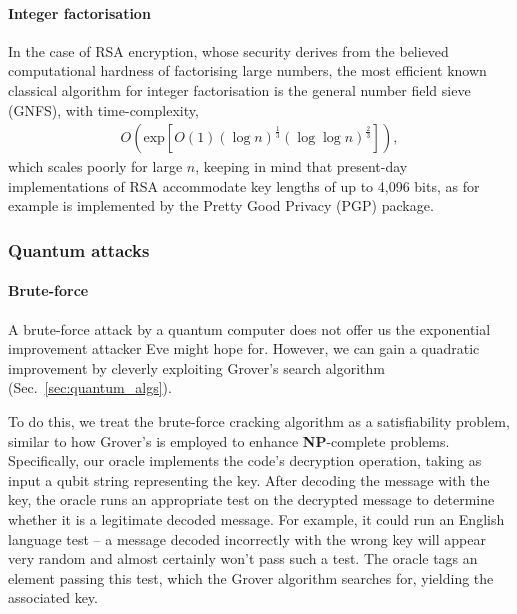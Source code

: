 %
%
 
\paragraph{Integer factorisation}

In the case of RSA encryption, whose security derives from the believed computational hardness of factorising large numbers, the most efficient known classical algorithm for integer factorisation is the general number field sieve (GNFS), with time-complexity,
\begin{align} \label{eq:GNFS_scaling}
	O(\mathrm{exp}[O(1) (\log n)^{\frac{1}{3}} (\log\log n)^{\frac{2}{3}}]),
\end{align}
which scales poorly for large $n$, keeping in mind that present-day implementations of RSA accommodate key lengths of up to 4,096 bits, as for example is implemented by the Pretty Good Privacy (PGP) package.

%
%

\subsubsection{Quantum attacks}

%
%

\paragraph{Brute-force}

A brute-force attack by a quantum computer does not offer us the exponential improvement attacker Eve might hope for. However, we can gain a quadratic improvement by cleverly exploiting Grover's search algorithm (Sec.~\ref{sec:quantum_algs}).

To do this, we treat the brute-force cracking algorithm as a satisfiability problem, similar to how Grover's is employed to enhance \textbf{NP}-complete problems. Specifically, our oracle implements the code's decryption operation, taking as input a qubit string representing the key. After decoding the message with the key, the oracle runs an appropriate test on the decrypted message to determine whether it is a legitimate decoded message. For example, it could run an English language test -- a message decoded incorrectly with the wrong key will appear very random and almost certainly won't pass such a test. The oracle tags an element passing this test, which the Grover algorithm searches for, yielding the associated key.

